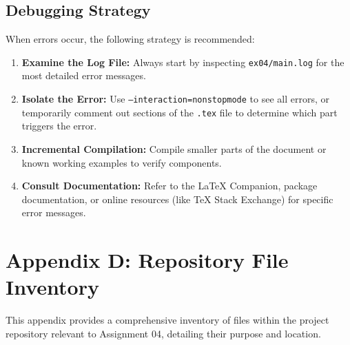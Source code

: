 \documentclass{custom-academic-template}
\begin{document}
\subsection{Debugging Strategy}
When errors occur, the following strategy is recommended:
\begin{enumerate}
    \item 	\textbf{Examine the Log File:} Always start by inspecting 	\texttt{ex04/main.log} for the most detailed error messages.
    \item 	\textbf{Isolate the Error:} Use 	\texttt{--interaction=nonstopmode} to see all errors, or temporarily comment out sections of the 	\texttt{.tex} file to determine which part triggers the error.
    \item 	\textbf{Incremental Compilation:} Compile smaller parts of the document or known working examples to verify components.
    \item 	\textbf{Consult Documentation:} Refer to the LaTeX Companion, package documentation, or online resources (like TeX Stack Exchange) for specific error messages.
\end{enumerate}

\section{Appendix D: Repository File Inventory}
This appendix provides a comprehensive inventory of files within the project repository relevant to Assignment 04, detailing their purpose and location.
\end{document}
